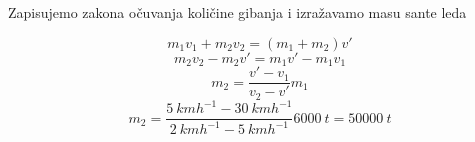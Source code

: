 
Zapisujemo zakona očuvanja količine gibanja i izražavamo masu sante leda

$$ m_1v_1 + m_2v_2=(m_1 + m_2)v'$$
$$m_2v_2 - m_2v' = m_1v' - m_1v_1 $$
$$ m_2 = \frac{v' - v_1}{v_2 - v'}m_1 $$
$$ m_2 = \frac{5\ kmh^{-1} - 30\ kmh^{-1} }{2\ kmh^{-1} - 5 \ kmh^{-1}}6000 \ t =50 000\ t $$